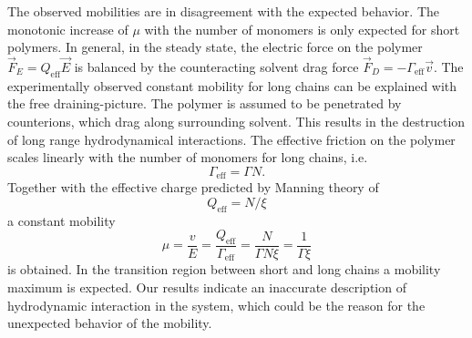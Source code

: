 
The observed mobilities are in disagreement with the expected behavior. The monotonic increase of $\mu$ with the number of monomers is only expected for short polymers. In general, in the steady state, the electric force on the polymer $\vec{F}_E = Q_\text{eff} \vec{E}$ is balanced by the counteracting solvent drag force $\vec{F}_D = -\Gamma_\text{eff} \vec{v}$. The experimentally observed constant mobility for long chains can be explained with the free draining-picture. The polymer is assumed to be penetrated by counterions, which drag along surrounding solvent. This results in the destruction of long range hydrodynamical interactions. The effective friction on the polymer scales linearly with the number of monomers for long chains, i.e.
\begin{equation}
	\Gamma_\text{eff} = \Gamma N.
\end{equation}
Together with the effective charge predicted by Manning theory of
\begin{equation}
	Q_\text{eff} = N / \xi
\end{equation}
a constant mobility
\begin{equation}
	\mu = \frac{v}{E} = \frac{Q_\text{eff}}{\Gamma_\text{eff}} = \frac{N}{\Gamma N \xi} = \frac{1}{\Gamma \xi}
\end{equation}
is obtained. In the transition region between short and long chains a mobility maximum is expected. Our results indicate an inaccurate description of hydrodynamic interaction in the system, which could be the reason for the unexpected behavior of the mobility.